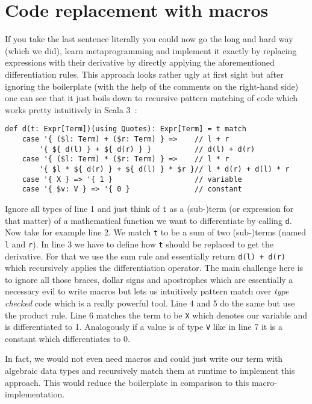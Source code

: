 \section{Code replacement with macros} \label{sec:macros}
If you take the last sentence literally you could now go the long and hard way (which we did), learn metaprogramming and implement it exactly by replacing expressions with their derivative by directly applying the aforementioned differentiation rules. This approach looks rather ugly at first sight but after ignoring the boilerplate (with the help of the comments on the right-hand side) one can see that it just boils down to recursive pattern matching of code which works pretty intuitively in Scala 3~\cite{maScala3}:
\begin{lstlisting}
def d(t: Expr[Term])(using Quotes): Expr[Term] = t match
    case '{ ($l: Term) + ($r: Term) } =>    // l + r
        '{ ${ d(l) } + ${ d(r) } }          // d(l) + d(r)
    case '{ ($l: Term) * ($r: Term) } =>    // l * r
        '{ $l * ${ d(r) } + ${ d(l) } * $r }// l * d(r) + d(l) * r
    case '{ X } => '{ 1 }                   // variable
    case '{ $v: V } => '{ 0 }               // constant
\end{lstlisting}
 Ignore all types of line 1 and just think of \lstinline{t} as a (sub-)term (or expression for that matter) of a mathematical function we want to differentiate by calling \lstinline{d}. Now take for example line 2. We match \lstinline{t} to be a sum of two (sub-)terms (named \lstinline{l} and \lstinline{r}). In line 3 we have to define how \lstinline{t} should be replaced to get the derivative. For that we use the sum rule and essentially return \lstinline{d(l) + d(r)} which recursively applies the differentiation operator. The main challenge here is to ignore all those braces, dollar signs and apostrophes which are essentially a necessary evil to write macros but lets us intuitively pattern match over \emph{type checked} code which is a really powerful tool. Line 4 and 5 do the same but use the product rule. Line 6 matches the term to be \lstinline{X} which denotes our variable and is differentiated to 1. Analogously if a value is of type \lstinline{V} like in line 7 it is a constant which differentiates to 0.

In fact, we would not even need macros and could just write our term with algebraic data types and recursively match them at runtime to implement this approach. This would reduce the boilerplate in comparison to this macro-implementation.


